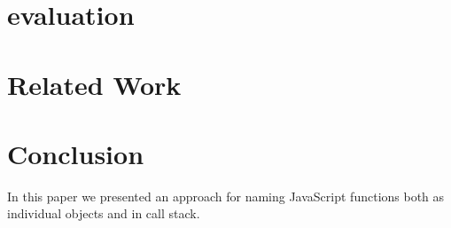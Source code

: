 \documentclass[conference]{IEEEtran}
\begin{document}
\section{evaluation}



\section{Related Work}

\section{Conclusion}
In this paper we presented an approach for naming JavaScript functions both
as individual objects and in call stack. 
\end{document}
